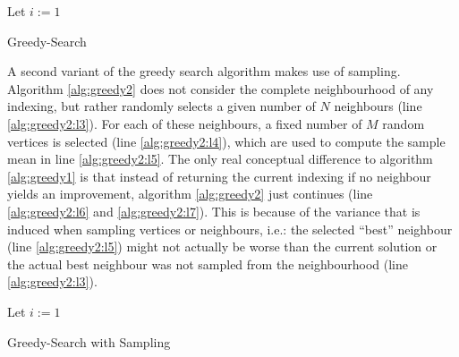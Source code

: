 \begin{algorithm}[H]
    \SetAlgoLined
    \DontPrintSemicolon
    Let $i := 1$ \;
    \Return{$\idx$}
    \caption{Greedy-Search} \label{alg:greedy1}
\end{algorithm}

A second variant of the greedy search algorithm makes use of sampling. Algorithm \ref{alg:greedy2} does not consider the complete neighbourhood of any indexing, but rather randomly selects a given number of $N$ neighbours (line \ref{alg:greedy2:l3}). For each of these neighbours, a fixed number of $M$ random vertices is selected (line \ref{alg:greedy2:l4}), which are used to compute the sample mean in line \ref{alg:greedy2:l5}. The only real conceptual difference to algorithm \ref{alg:greedy1} is that instead of returning the current indexing if no neighbour yields an improvement, algorithm \ref{alg:greedy2} just continues (line \ref{alg:greedy2:l6} and \ref{alg:greedy2:l7}). This is because of the variance that is induced when sampling vertices or neighbours, i.e.: the selected ``best'' neighbour (line \ref{alg:greedy2:l5}) might not actually be worse than the current solution or the actual best neighbour was not sampled from the neighbourhood (line \ref{alg:greedy2:l3}).

\begin{algorithm}[H]
    \SetAlgoLined
    \DontPrintSemicolon
    Let $i := 1$ \label{alg:greedy2:l1} \;
    \Return{$\idx$}  \label{alg:greedy2:l9} 
    \caption{Greedy-Search with Sampling} \label{alg:greedy2}
\end{algorithm}

